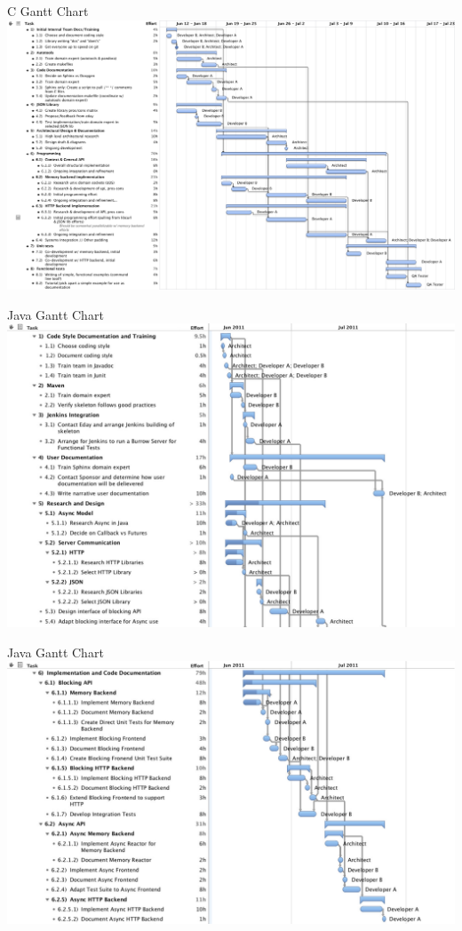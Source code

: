 \documentclass{beamer}
\begin{document}
\begin{frame}{C Gantt Chart}
  \includegraphics[width=0.95\linewidth]{C-Gantt.pdf}
\end{frame}

\begin{frame}{Java Gantt Chart}
  \includegraphics[width=0.95\linewidth]{Java-Gantt-P1.pdf}
\end{frame}

\begin{frame}{Java Gantt Chart}
  \includegraphics[width=0.95\linewidth]{Java-Gantt-P2.pdf}
\end{frame}
\end{document}

